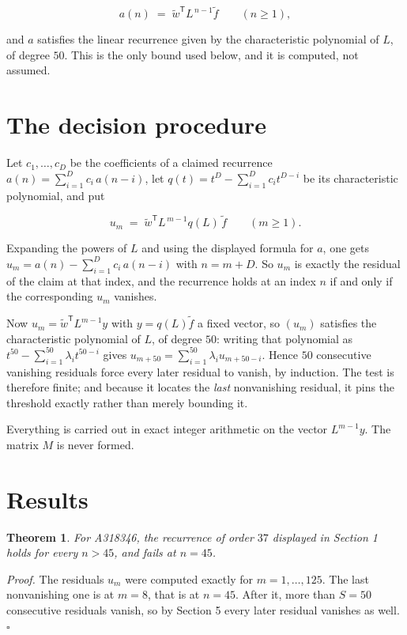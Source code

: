 \documentclass[11pt]{article}
\newtheorem{theorem}{Theorem}
\theoremstyle{definition}
\begin{document}
\[a(n) \;=\; \tilde w^{\mathsf T} L^{\,n-1} \tilde f \qquad (n \ge 1),\]

and $a$ satisfies the linear recurrence given by the characteristic polynomial of $L$, of degree $50$. This is the only bound used below, and it is computed, not assumed.

\section{The decision procedure}

Let $c_1,\dots,c_D$ be the coefficients of a claimed recurrence $a(n) = \sum_{i=1}^{D} c_i\,a(n-i)$, let $q(t) = t^{D} - \sum_{i=1}^{D} c_i t^{D-i}$ be its characteristic polynomial, and put

\[u_m \;=\; \tilde w^{\mathsf T} L^{\,m-1} q(L)\,\tilde f \qquad (m \ge 1).\]

Expanding the powers of $L$ and using the displayed formula for $a$, one gets $u_m = a(n) - \sum_{i=1}^{D} c_i\,a(n-i)$ with $n = m + D$. So $u_m$ is exactly the residual of the claim at that index, and the recurrence holds at an index $n$ if and only if the corresponding $u_m$ vanishes.

Now $u_m = \tilde w^{\mathsf T} L^{m-1} y$ with $y = q(L)\tilde f$ a fixed vector, so $(u_m)$ satisfies the characteristic polynomial of $L$, of degree $50$: writing that polynomial as $t^{50} - \sum_{i=1}^{50} \lambda_i t^{50-i}$ gives $u_{m+50} = \sum_{i=1}^{50} \lambda_i u_{m+50-i}$. Hence $50$ consecutive vanishing residuals force every later residual to vanish, by induction. The test is therefore finite; and because it locates the {\itshape last} nonvanishing residual, it pins the threshold exactly rather than merely bounding it.

Everything is carried out in exact integer arithmetic on the vector $L^{m-1}y$. The matrix $M$ is never formed.

\section{Results}

\begin{theorem} For A318346, the recurrence of order $37$ displayed in Section 1 holds for every $n > 45$, and fails at $n = 45$.\end{theorem}

{\itshape Proof.} The residuals $u_m$ were computed exactly for $m = 1,\dots,125$. The last nonvanishing one is at $m = 8$, that is at $n = 45$. After it, more than $S = 50$ consecutive residuals vanish, so by Section 5 every later residual vanishes as well. $\square$
\end{document}
